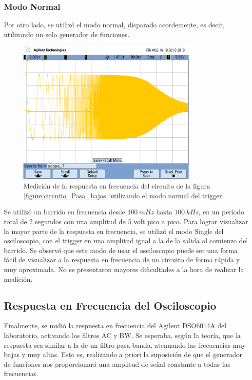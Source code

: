 \documentclass[11pt, a4paper]{article}
\begin{document}
\subsubsection*{Modo Normal}
Por otro lado, se utilizó el modo normal, disparado acordemente, es decir, utilizando un solo generador de funciones.
\begin{figure}[H]
	\centering
	\includegraphics[width=0.8\textwidth,trim={0.6cm 7cm  1 5cm},clip]{ej3normal.png}
	\caption{Medición de la respuesta en frecuencia del circuito de la figura \ref{figure:circuito_Pasa_bajos} utilizando el modo normal del trigger.} 
	\label{graf:ej3modonormal}
\end{figure}
Se utilizó un barrido en frecuencia desde $100 \ mHz$ hasta $100 \ kHz$, en un período total de 2 segundos con una amplitud de 5 volt pico a pico. Para lograr visualizar la mayor parte de la respuesta en frecuencia, se utilizó el modo Single del osciloscopio, con el trigger en una amplitud igual a la de la salida al comienzo del barrido. Se observó que este modo de usar el osciloscopio puede ser una forma fácil de visualizar a la respuesta en frecuencia de un circuito de forma rápida y muy aproximada. No se presentaron mayores dificultades a la hora de realizar la medición.

\break

\subsection*{Respuesta en Frecuencia del Osciloscopio}
Finalmente, se midió la respuesta en frecuencia del Agilent DSO6014A del laboratorio, activando los filtros AC y BW. Se esperaba, según la teoría, que la respuesta sea similar a la de un filtro pasa-banda, atenuando las frecuencias muy bajas y muy altas. Esto es, realizando a priori la suposición de que el generador de funciones nos proporcionará una amplitud de señal constante a todas las frecuencias.
\end{document}

